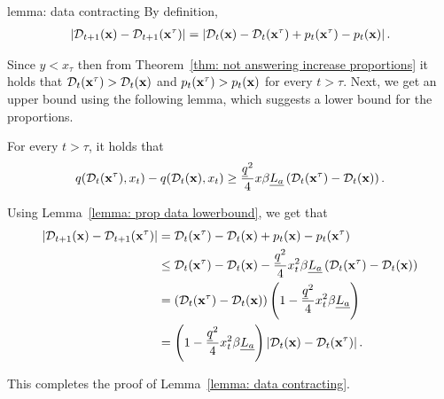 \begin{proofof}{lemma: data contracting}
By definition,
\begin{align*}
\left| \mathcal{D}_{t+1}({\bf{x}}) - \mathcal{D}_{t+1}({\bf{x}}^\tau) \right| = \left| \mathcal{D}_{t}({\bf{x}}) - \mathcal{D}_{t}({\bf{x}}^\tau) + p_t({\bf{x}}^\tau) - p_t({\bf{x}}) \right|.
\end{align*}

Since $y < x_\tau$ then from Theorem~\ref{thm: not answering increase proportions} it holds that $\mathcal{D}_t({\bf{x}}^\tau) > \mathcal{D}_t({\bf{x}})$ and $p_t({\bf{x}}^\tau) > p_t({\bf{x}})$ for every $t > \tau$. Next, we get an upper bound using the following lemma, which suggests a lower bound for the proportions.
\begin{lemma} \label{lemma: prop data lowerbound}
For every $t > \tau$, it holds that
\begin{align*}
q(\mathcal{D}_t({\bf{x}}^\tau), x_t) - q(\mathcal{D}_t({\bf{x}}), x_t) \geq \frac{\underline{q} ^2}{4} x \beta \underline{L_a} \left( \mathcal{D}_t({\bf{x}}^\tau) - \mathcal{D}_t({\bf{x}}) \right).
\end{align*}
\end{lemma}
Using Lemma~\ref{lemma: prop data lowerbound}, we get that
\begin{align*}
\left| \mathcal{D}_{t+1}({\bf{x}}) - \mathcal{D}_{t+1}({\bf{x}}^\tau) \right| &= \mathcal{D}_{t}({\bf{x}}^\tau) - \mathcal{D}_{t}({\bf{x}}) + p_t({\bf{x}}) - p_t({\bf{x}}^\tau) \\
&\leq \mathcal{D}_{t}({\bf{x}}^\tau) - \mathcal{D}_{t}({\bf{x}}) - \frac{\underline{q} ^2}{4} x_t^2 \beta \underline{L_a} \left( \mathcal{D}_t({\bf{x}}^\tau) - \mathcal{D}_t({\bf{x}}) \right) \\
&= \left(\mathcal{D}_{t}({\bf{x}}^\tau) - \mathcal{D}_{t}({\bf{x}}) \right) \left(1 - \frac{\underline{q} ^2}{4} x_t^2 \beta \underline{L_a} \right) \\
&= \left(1 - \frac{\underline{q} ^2}{4} x_t^2 \beta \underline{L_a} \right) \left| \mathcal{D}_{t}({\bf{x}}) - \mathcal{D}_{t}({\bf{x}}^\tau) \right|.
\end{align*}

This completes the proof of Lemma~\ref{lemma: data contracting}.
\end{proofof}




